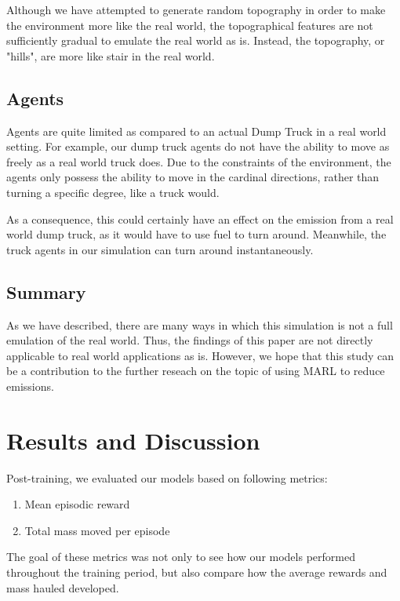 \documentclass[conference]{IEEEtran}
\begin{document}
Although we have attempted to generate random topography in order to make the environment more like
the real world, the topographical features are not sufficiently gradual to emulate the real world as is.
Instead, the topography, or "hills", are more like stair in the real world.


\subsection{Agents}
Agents are quite limited as compared to an actual Dump Truck in a real world setting. For example,
our dump truck agents do not have the ability to move as freely as a real world truck does. Due to the
constraints of the environment, the agents only possess the ability to move in the cardinal directions,
rather than turning a specific degree, like a truck would.

As a consequence, this could certainly have an effect on the emission from a real world dump truck, as
it would have to use fuel to turn around. Meanwhile, the truck agents in our simulation can turn around
instantaneously.


\subsection{Summary}
As we have described, there are many ways in which this simulation is not a full emulation of the
real world. Thus, the findings of this paper are not directly applicable to real world applications
as is. However, we hope that this study can be a contribution to the further reseach on the topic of
using MARL to reduce emissions.


\section{Results and Discussion}
Post-training, we evaluated our models based on following metrics:

\begin{enumerate}
	\item Mean episodic reward
	\item Total mass moved per episode
\end{enumerate}

The goal of these metrics was not only to see how our models performed throughout the training period, but also compare how the average rewards and mass hauled developed.
\end{document}
